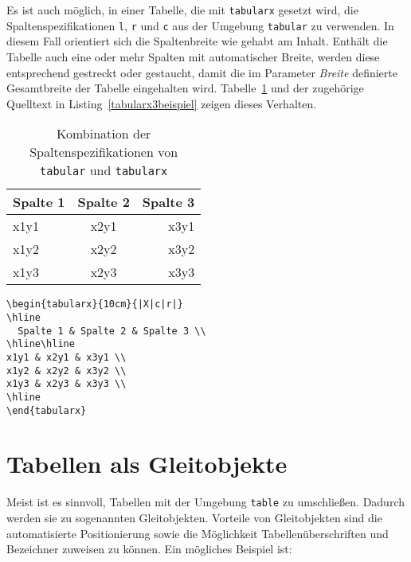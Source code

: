 Es ist auch möglich, in einer Tabelle, die mit \verb!tabularx! gesetzt wird, die Spaltenspezifikationen \verb!l!, \verb!r! und \verb!c! aus der Umgebung \verb!tabular! zu verwenden. In diesem Fall orientiert sich die Spaltenbreite wie gehabt am Inhalt. Enthält die Tabelle auch eine oder mehr Spalten mit automatischer Breite, werden diese entsprechend gestreckt oder gestaucht, damit die im Parameter \textsl{Breite} definierte Gesamtbreite der Tabelle eingehalten wird. Tabelle~\ref{Tabelle_tabularx3} und der zugehörige Quelltext in Listing~\ref{tabularx3beispiel} zeigen dieses Verhalten.



\begin{table}[h!tb]
\centering
\caption{Kombination der Spaltenspezifikationen von \texttt{tabular} und \texttt{tabularx}}
\label{Tabelle_tabularx3}
\begin{tabularx}{10cm}{|X|c|r|}
\hline
  Spalte 1 & Spalte 2 & Spalte 3 \\
\hline\hline
x1y1 & x2y1 & x3y1 \\
x1y2 & x2y2 & x3y2 \\
x1y3 & x2y3 & x3y3 \\
\hline
\end{tabularx}
\end{table}



\begin{lstlisting}[caption={Kombination der Spaltenspezifikationen von \texttt{tabular} und \texttt{tabularx}},label=tabularx3beispiel, style=customlatex]
\begin{tabularx}{10cm}{|X|c|r|}
\hline
  Spalte 1 & Spalte 2 & Spalte 3 \\
\hline\hline
x1y1 & x2y1 & x3y1 \\
x1y2 & x2y2 & x3y2 \\
x1y3 & x2y3 & x3y3 \\
\hline
\end{tabularx}
\end{lstlisting}

\section{Tabellen als Gleitobjekte}
\label{sec:tabellen_gleitobjekte}

Meist ist es sinnvoll, Tabellen mit der Umgebung \verb!table! zu umschließen. Dadurch werden sie zu sogenannten Gleitobjekten. Vorteile von Gleitobjekten sind die automatisierte Positionierung sowie die Möglichkeit Tabellenüberschriften und Bezeichner zuweisen zu können. Ein mögliches Beispiel ist:

